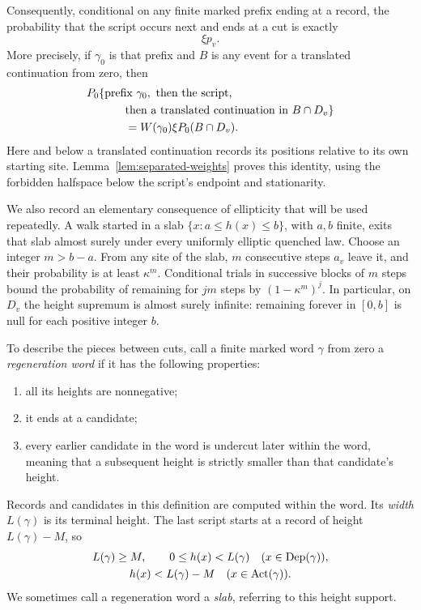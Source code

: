 Consequently, conditional on any finite marked prefix ending at a
record, the probability that the script occurs next and ends at a cut
is exactly
\begin{equation}\label{eq:script-probability}
 \xi p_v.
\end{equation}
More precisely, if \(\gamma_0\) is that prefix and \(B\) is any
event for a translated continuation from zero, then
\begin{equation}\label{eq:record-suffix-factorization}
 \begin{split}
 &P_0\{\text{prefix }\gamma_0,\ \text{then the script,}\\
 &\hspace{12mm}\text{then a translated continuation in }B\cap D_v\}\\
 &\hspace{12mm}=W(\gamma_0)\xi P_0(B\cap D_v).
 \end{split}
\end{equation}
Here and below a translated continuation records its positions
relative to its own starting site.  Lemma~\ref{lem:separated-weights}
proves this identity, using the forbidden halfspace below the script's
endpoint and stationarity.

We also record an elementary consequence of ellipticity that will be
used repeatedly.  A walk started in a slab
\(\{x:a\le h(x)\le b\}\), with \(a,b\) finite, exits that slab
almost surely under every uniformly elliptic quenched law.  Choose an
integer \(m>b-a\).  From any site of the slab, \(m\) consecutive
steps \(a_v\) leave it, and their probability is at least
\(\kappa^m\).  Conditional trials in successive blocks of \(m\)
steps bound the probability of remaining for \(jm\) steps by
\((1-\kappa^m)^j\).  In particular, on \(D_v\) the height supremum
is almost surely infinite: remaining forever in \([0,b]\) is null for
each positive integer \(b\).

To describe the pieces between cuts, call a finite marked word
\(\gamma\) from zero a \emph{regeneration word} if it has the
following properties:
\begin{enumerate}[label=(\roman*),leftmargin=*]
 \item all its heights are nonnegative;
 \item it ends at a candidate;
 \item every earlier candidate in the word is undercut later within
       the word, meaning that a subsequent height is strictly smaller
       than that candidate's height.
\end{enumerate}
Records and candidates in this definition are computed within the
word.  Its \emph{width} \(L(\gamma)\) is its terminal height.  The
last script starts at a record of height \(L(\gamma)-M\), so
\begin{equation}\label{eq:word-height-support}
 \begin{gathered}
 L(\gamma)\ge M,\qquad
 0\le h(x)<L(\gamma)\quad(x\in\operatorname{Dep}(\gamma)),\\
 h(x)<L(\gamma)-M\quad(x\in\operatorname{Act}(\gamma)).
 \end{gathered}
\end{equation}
We sometimes call a regeneration word a \emph{slab}, referring to this
height support.

